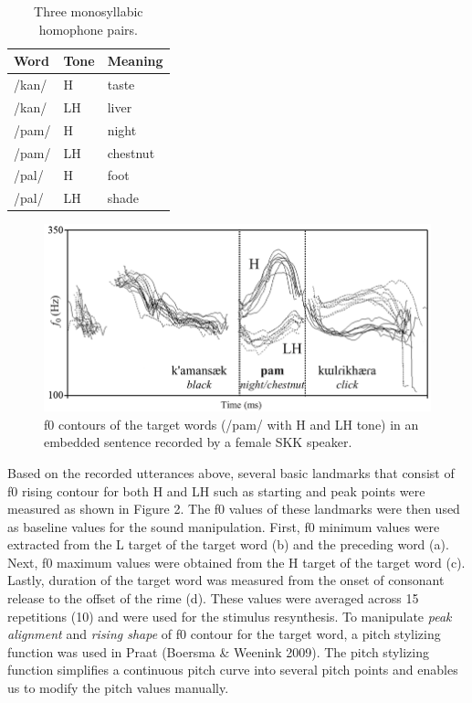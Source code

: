 \documentclass[
  man,floatsintext]{apa6}
\begin{document}
\begin{table}[H]

\caption{\label{tab:table1}Three monosyllabic homophone pairs.}
\centering
\begin{tabular}[t]{l|l|l}
\hline
Word & Tone & Meaning\\
\hline
/kan/ & H & taste\\
\hline
/kan/ & LH & liver\\
\hline
/pam/ & H & night\\
\hline
/pam/ & LH & chestnut\\
\hline
/pal/ & H & foot\\
\hline
/pal/ & LH & shade\\
\hline
\end{tabular}
\end{table}
\begin{figure}

{\centering \includegraphics[width=0.9\linewidth]{images/picture1} 

}

\caption{f0 contours of the target words (/pam/ with H and LH tone) in an embedded sentence recorded by a female SKK speaker.}\label{fig:picture1}
\end{figure}

Based on the recorded utterances above, several basic landmarks that consist of f0 rising contour for both H and LH such as starting and peak points were measured as shown in Figure 2. The f0 values of these landmarks were then used as baseline values for the sound manipulation. First, f0 minimum values were extracted from the L target of the target word (b) and the preceding word (a). Next, f0 maximum values were obtained from the H target of the target word (c). Lastly, duration of the target word was measured from the onset of consonant release to the offset of the rime (d). These values were averaged across 15 repetitions (10) and were used for the stimulus resynthesis. To manipulate \emph{peak alignment} and \emph{rising shape} of f0 contour for the target word, a pitch stylizing function was used in Praat (Boersma \& Weenink 2009). The pitch stylizing function simplifies a continuous pitch curve into several pitch points and enables us to modify the pitch values manually.
\end{document}
